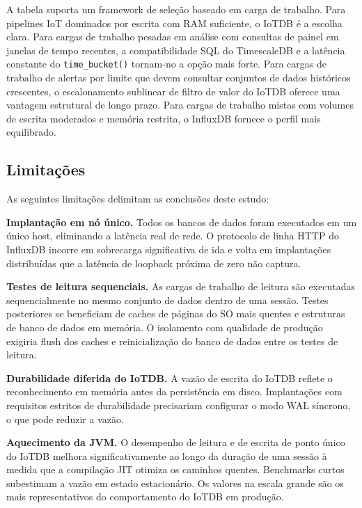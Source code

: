 A tabela suporta um framework de seleção baseado em carga de trabalho. Para pipelines IoT
dominados por escrita com RAM suficiente, o IoTDB é a escolha clara. Para cargas de trabalho
pesadas em análise com consultas de painel em janelas de tempo recentes, a compatibilidade SQL
do TimescaleDB e a latência constante do \texttt{time\_bucket()} tornam-no a opção mais
forte. Para cargas de trabalho de alertas por limite que devem consultar conjuntos de dados
históricos crescentes, o escalonamento sublinear de filtro de valor do IoTDB oferece uma
vantagem estrutural de longo prazo. Para cargas de trabalho mistas com volumes de escrita
moderados e memória restrita, o InfluxDB fornece o perfil mais equilibrado.

\subsection{Limitações}
\label{sec:limitations}

As seguintes limitações delimitam as conclusões deste estudo:

\textbf{Implantação em nó único.} Todos os bancos de dados foram executados em um único host,
eliminando a latência real de rede. O protocolo de linha HTTP do InfluxDB incorre em sobrecarga
significativa de ida e volta em implantações distribuídas que a latência de loopback
próxima de zero não captura.

\textbf{Testes de leitura sequenciais.} As cargas de trabalho de leitura são executadas
sequencialmente no mesmo conjunto de dados dentro de uma sessão. Testes posteriores se
beneficiam de caches de páginas do SO mais quentes e estruturas de banco de dados em memória.
O isolamento com qualidade de produção exigiria flush dos caches e reinicialização do banco
de dados entre os testes de leitura.

\textbf{Durabilidade diferida do IoTDB.} A vazão de escrita do IoTDB reflete o reconhecimento
em memória antes da persistência em disco. Implantações com requisitos estritos de durabilidade
precisariam configurar o modo WAL síncrono, o que pode reduzir a vazão.

\textbf{Aquecimento da JVM.} O desempenho de leitura e de escrita de ponto único do IoTDB
melhora significativamente ao longo da duração de uma sessão à medida que a compilação JIT
otimiza os caminhos quentes. Benchmarks curtos subestimam a vazão em estado estacionário.
Os valores na escala grande são os mais representativos do comportamento do IoTDB em produção.

